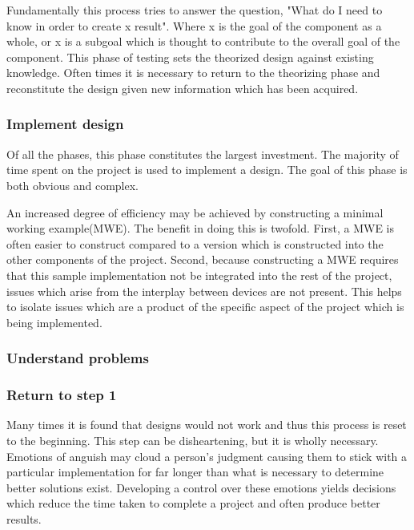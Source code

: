 \documentclass{article}	%
\begin{document}
\begin{multicols}{2}
Fundamentally this process tries to answer the question,
"What do I need to know in order to create x result".
Where x is the goal of the component as a whole, or
x is a subgoal which is thought to contribute to 
the overall goal of the component.
This phase of testing
sets the theorized design against existing knowledge.
Often times it is necessary to return to the 
theorizing phase and reconstitute the design
given new information which has been acquired.


\subsubsection{Implement design}
Of all the phases, 
this phase constitutes the largest investment.
The majority of time spent on the project is
used to implement a design.
The goal of this phase is both obvious
and complex.

An increased degree of efficiency may be achieved by
constructing a minimal working example(MWE).
The benefit in doing this is twofold.
First, a MWE is often easier to construct compared to
a version which is constructed into the other
components of the project.
Second, because constructing a MWE requires that
this sample implementation not be integrated into
the rest of the project,
issues which arise from the interplay between devices are not present.
This helps to isolate issues which are a product
of the specific aspect of the project which is being implemented.


\subsubsection{Understand problems}

\subsubsection{Return to step 1}
Many times it is found that designs would not work
and thus this process is reset to the beginning.
This step can be disheartening, but
it is wholly necessary.
Emotions of anguish may cloud a person's judgment
causing them to stick with a particular implementation
for far longer than what is necessary to determine 
better solutions exist.
Developing a control over these emotions
yields decisions which reduce the time
taken to complete a project and
often produce better results.


\end{multicols}
\end{document}
